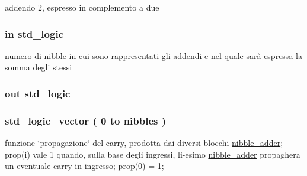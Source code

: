addendo 2, espresso in complemento a due 

\subsubsection[{\texorpdfstring{carry\+\_\+in}{carry_in}}]{ {\bfseries \textcolor{vhdlchar}{in}\textcolor{vhdlchar}{ }} {\bfseries \textcolor{vhdlchar}{std\+\_\+logic}\textcolor{vhdlchar}{ }} \hspace{0.3cm}{\ttfamily [Port]}}\hypertarget{group___carry_loockahead_ga1c211cdf2d4cf97e869c442832c53439}{}\label{group___carry_loockahead_ga1c211cdf2d4cf97e869c442832c53439}
numero di nibble in cui sono rappresentati gli addendi e nel quale sarà espressa la somma degli stessi 
\subsubsection[{\texorpdfstring{carry\+\_\+out}{carry_out}}]{ {\bfseries \textcolor{vhdlchar}{out}\textcolor{vhdlchar}{ }} {\bfseries \textcolor{vhdlchar}{std\+\_\+logic}\textcolor{vhdlchar}{ }} \hspace{0.3cm}{\ttfamily [Port]}}\hypertarget{group___carry_loockahead_ga851aaea297bdc862fba5478c4bf0e214}{}\label{group___carry_loockahead_ga851aaea297bdc862fba5478c4bf0e214}
\subsubsection[{\texorpdfstring{gen}{gen}}]{ {\bfseries \textcolor{vhdlchar}{std\+\_\+logic\+\_\+vector}\textcolor{vhdlchar}{ }\textcolor{vhdlchar}{(}\textcolor{vhdlchar}{ }\textcolor{vhdlchar}{ } \textcolor{vhdldigit}{0} \textcolor{vhdlchar}{ }\textcolor{vhdlchar}{to}\textcolor{vhdlchar}{ }\textcolor{vhdlchar}{ }\textcolor{vhdlchar}{ }\textcolor{vhdlchar}{ }{\bfseries {\bf nibbles}} \textcolor{vhdlchar}{ }\textcolor{vhdlchar}{)}\textcolor{vhdlchar}{ }} \hspace{0.3cm}{\ttfamily [Signal]}}\hypertarget{group___carry_loockahead_ga7a68948b7b96c7b51036939fad8e71b3}{}\label{group___carry_loockahead_ga7a68948b7b96c7b51036939fad8e71b3}
funzione \char`\"{}propagazione\char`\"{} del carry, prodotta dai diversi blocchi \hyperlink{classnibble__adder}{nibble\+\_\+adder}; prop(i) vale 1 quando, sulla base degli ingressi, l\textquotesingle{}i-\/esimo \hyperlink{classnibble__adder}{nibble\+\_\+adder} propaghera\textquotesingle{} un eventuale carry in ingresso; prop(0) = \textquotesingle{}1\textquotesingle{}; 
